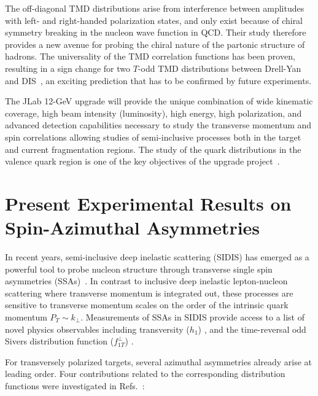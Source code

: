 The off-diagonal TMD distributions arise from interference between amplitudes 
with left- and right-handed polarization states, and only exist because of 
chiral symmetry breaking in the nucleon wave function in QCD.  Their study 
therefore provides a new avenue for probing the chiral nature of the partonic 
structure of hadrons.  The universality of the TMD correlation functions has 
been proven, resulting in a sign change for two $T$-odd TMD distributions 
between Drell-Yan and DIS~\cite{Collins:2002kn,Collins:2004nx}, an exciting 
prediction that has to be confirmed by future experiments.

The JLab 12-GeV upgrade will provide the unique combination of wide kinematic 
coverage, high beam intensity (luminosity), high energy, high polarization,
and advanced detection capabilities necessary to study the transverse momentum 
and spin correlations allowing studies of semi-inclusive processes both in the 
target and current fragmentation regions.  The study of the quark 
distributions  in the valence quark region is one of the key objectives of the 
upgrade project~\cite{CDR}.

\section{Present Experimental Results on Spin-Azimuthal Asymmetries}

In recent years, semi-inclusive deep inelastic scattering (SIDIS) has emerged 
as a powerful tool to probe nucleon structure through transverse single spin 
asymmetries (SSAs)~\cite{Airapetian:1999tv,Airapetian:2004tw,Alexakhin:2005iw}.
In contrast to inclusive deep inelastic lepton-nucleon scattering where 
transverse momentum is integrated out, these processes are sensitive to 
transverse momentum scales on the order of the intrinsic quark momentum
$P_T\sim k_\perp$.  Measurements of SSAs in SIDIS provide access to a list of 
novel physics observables including transversity ($h_1$)
\cite{Ralston:1979ys,Jaffe:1991ra}, and the time-reversal odd Sivers 
distribution function ($f_{1T}^\perp$) 
\cite{Sivers:1990fh,Anselmino:1998yz,Brodsky:2002cx,Collins:2002kn,Ji:2002aa}.

For transversely polarized targets, several azimuthal asymmetries already 
arise at leading order.  Four contributions related to the corresponding 
distribution functions were investigated in Refs.~\cite{Collins:1992kk,Mulders:1995dh,Kotzinian:1994dv,Brodsky:2002cx,Ji:2002aa,Kotzinian:1995cz}:

